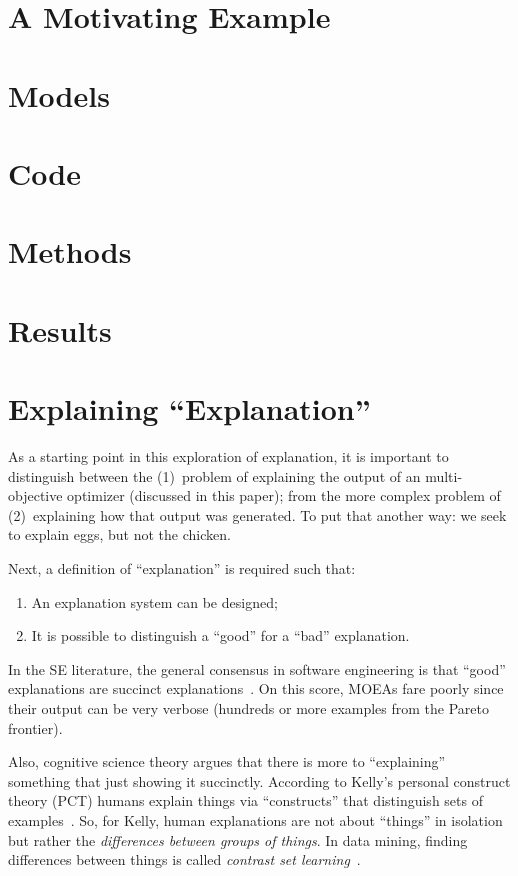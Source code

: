 \documentclass[runningheads]{llncs}
\newcommand{\be}{\begin{enumerate}}
\newcommand{\ee}{\end{enumerate}}
\begin{document}
\section{A Motivating Example}


\section{Models}


\section{Code}


\section{Methods}

\section{Results}


\section{Explaining ``Explanation''}
As a starting point in this exploration of explanation,
it is important to distinguish between the
(1)~problem of explaining the output of an
multi-objective optimizer (discussed in this paper);
from the more complex problem of (2)~explaining how
that output was generated.  To put that another way:
we seek to explain eggs, but not
the chicken.

Next, a definition of  ``explanation'' is required such that:
\be
\item An explanation system can be designed;
\item It is possible to distinguish a  ``good'' for a ``bad'' explanation.
\ee
In the SE literature,
the general consensus in
software engineering is that ``good'' explanations
are succinct explanations~\cite{ag98,dej13z,fenton99}.
On this score, MOEAs fare poorly since their output can be very verbose
(hundreds or more examples from the Pareto frontier).


Also, cognitive science theory argues that
there is more to ``explaining'' something that just
showing it succinctly. According to Kelly's personal
construct theory (PCT) humans explain things via
``constructs'' that distinguish sets of examples~\cite{kelly55}.
So, for Kelly, human explanations are not about
``things'' in isolation but rather the {\em
differences between groups of things}. In data mining, finding
differences between things is called {\em contrast set learning}~\cite{webb09}.
\end{document}
